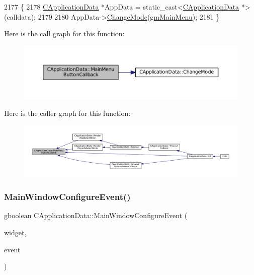 \begin{DoxyCode}
2177                                                            \{
2178     \hyperlink{classCApplicationData}{CApplicationData} *AppData = \textcolor{keyword}{static\_cast<}\hyperlink{classCApplicationData}{CApplicationData} *\textcolor{keyword}{>}(calldata);
2179     
2180     AppData->\hyperlink{classCApplicationData_aee18c113e9a0acb3cad3d63eb19de71b}{ChangeMode}(\hyperlink{classCApplicationData_ac8ac37a4c8bb871036fbbdc6a072e403ad2500485f81c2bf3c1814a969082783b}{gmMainMenu});
2181 \}
\end{DoxyCode}
Here is the call graph for this function\+:
\nopagebreak
\begin{figure}[H]
\begin{center}
\leavevmode
\includegraphics[width=350pt]{classCApplicationData_a4410839118b5b74dab798ad7be6f703b_cgraph}
\end{center}
\end{figure}
Here is the caller graph for this function\+:
\nopagebreak
\begin{figure}[H]
\begin{center}
\leavevmode
\includegraphics[width=350pt]{classCApplicationData_a4410839118b5b74dab798ad7be6f703b_icgraph}
\end{center}
\end{figure}
\hypertarget{classCApplicationData_a7abef8a548d0ad3adb70f11d8a74176c}{}\label{classCApplicationData_a7abef8a548d0ad3adb70f11d8a74176c} 
\subsubsection{\texorpdfstring{Main\+Window\+Configure\+Event()}{MainWindowConfigureEvent()}}
{\footnotesize\ttfamily gboolean C\+Application\+Data\+::\+Main\+Window\+Configure\+Event (\begin{DoxyParamCaption}\item[{Gtk\+Widget $\ast$}]{widget,  }\item[{Gdk\+Event $\ast$}]{event }\end{DoxyParamCaption})\hspace{0.3cm}{\ttfamily [protected]}}



